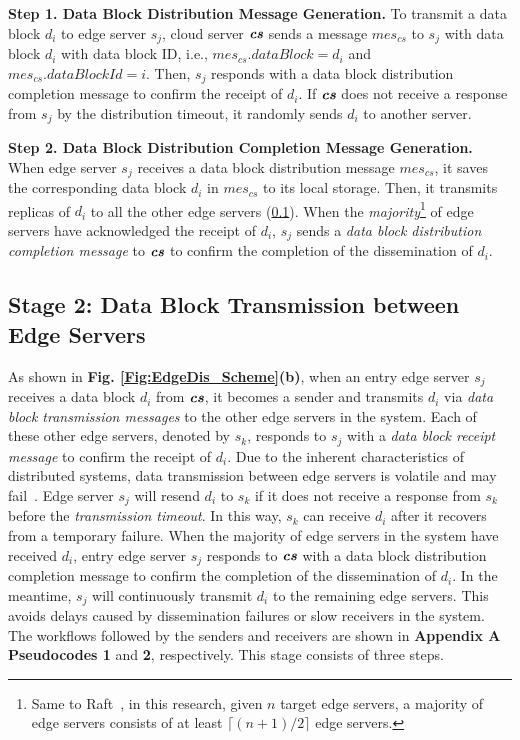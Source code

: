 \documentclass[10pt,journal,compsoc]{IEEEtran}
\def\mathbi#1{\textbf{\em #1}}
\begin{document}
\smallskip
\textbf{Step 1. Data Block Distribution Message Generation.} To transmit a data block $d_i$ to edge server $s_j$, cloud server $\mathbi{cs}$ sends a message $mes_{cs}$ to $s_j$ with data block $d_i$ with data block ID, i.e., $mes_{cs}.dataBlock=d_i$ and $mes_{cs}.dataBlockId=i$. Then, $s_j$ responds with a data block distribution completion message to confirm the receipt of $d_i$. If $\mathbi{cs}$ does not receive a response from $s_j$ by the distribution timeout, it randomly sends $d_i$ to another server.

\smallskip
\textbf{Step 2. Data Block Distribution Completion Message Generation.} When edge server $s_j$ receives a data block distribution message $mes_{cs}$, it saves the corresponding data block $d_i$ in $mes_{cs}$ to its local storage. Then, it transmits replicas of $d_i$ to all the other edge servers (\cref{subSec:DataExchange}). When the \textit{majority}\footnote{Same to Raft~\cite{ongaro2014Raft}, in this research, given $n$ target edge servers, a majority of edge servers consists of at least $\lceil (n+1)/2\rceil$ edge servers.} of edge servers have acknowledged the receipt of $d_i$, $s_j$ sends a \textit{data block distribution completion message} to $\mathbi{cs}$ to confirm the completion of the dissemination of $d_i$. 

%
\subsection{Stage 2: Data Block Transmission between Edge Servers}
\label{subSec:DataExchange}
%

As shown in \textbf{Fig. \ref{Fig:EdgeDis_Scheme}(b)}, when an entry edge server $s_j$ receives a data block $d_i$ from $\mathbi{cs}$, it becomes a sender and transmits $d_i$ via \textit{data block transmission messages} to the other edge servers in the system. Each of these other edge servers, denoted by $s_k$, responds to $s_j$ with a \textit{data block receipt message} to confirm the receipt of $d_i$. Due to the inherent characteristics of distributed systems, data transmission between edge servers is volatile and may fail~\cite{ rafique2020complementing}. Edge server $s_j$ will resend $d_i$ to $s_k$ if it does not receive a response from $s_k$ before the \textit{transmission timeout}. In this way, $s_k$ can receive $d_i$ after it recovers from a temporary failure. When the majority of edge servers in the system have received $d_i$, entry edge server $s_j$ responds to $\mathbi{cs}$ with a data block distribution completion message to confirm the completion of the dissemination of $d_i$. In the meantime, $s_j$ will continuously transmit $d_i$ to the remaining edge servers. This avoids delays caused by dissemination failures or slow receivers in the system. The workflows followed by the senders and receivers are shown in \textbf{Appendix A Pseudocodes 1} and \textbf{2}, respectively. This stage consists of three steps.
\end{document}

